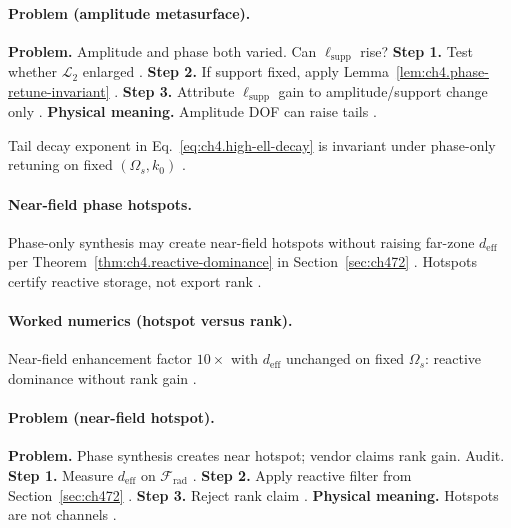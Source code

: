 \paragraph{Problem (amplitude metasurface).}
\textbf{Problem.} Amplitude and phase both varied. Can \(\ell_{\mathrm{supp}}\) rise?
\textbf{Step 1.} Test whether \(\mathcal{L}_{2}\) enlarged \cite{stratton1941,harrington2001}.
\textbf{Step 2.} If support fixed, apply Lemma~\ref{lem:ch4.phase-retune-invariant} \cite{hansen1988,devaney2004}.
\textbf{Step 3.} Attribute \(\ell_{\mathrm{supp}}\) gain to amplitude/support change only \cite{jackson1999,collin2001}.
\textbf{Physical meaning.} Amplitude DOF can raise tails \cite{harrington2001,stratton1941}.

\begin{corollary}
\label{cor:ch4.phase-tail-invariant}
Tail decay exponent in Eq.~\eqref{eq:ch4.high-ell-decay} is invariant under phase-only retuning on fixed \((\Omega_{s},k_{0})\)
\cite{hansen1988,jackson1999,stratton1941,harrington2001,devaney2004}.
\end{corollary}

\paragraph{Near-field phase hotspots.}
Phase-only synthesis may create near-field hotspots without raising far-zone \(d_{\mathrm{eff}}\) per Theorem~\ref{thm:ch4.reactive-dominance} in
Section~\ref{sec:ch472} \cite{stratton1941,harrington2001,hansen1988,devaney2004,jackson1999,collin2001}. Hotspots certify reactive storage, not export rank
\cite{harrington2001,stratton1941}.

\paragraph{Worked numerics (hotspot versus rank).}
Near-field enhancement factor \(10\times\) with \(d_{\mathrm{eff}}\) unchanged on fixed \(\Omega_{s}\): reactive dominance without rank gain
\cite{harrington2001,jackson1999,stratton1941,hansen1988,devaney2004,collin2001}.

\paragraph{Problem (near-field hotspot).}
\textbf{Problem.} Phase synthesis creates near hotspot; vendor claims rank gain. Audit.
\textbf{Step 1.} Measure \(d_{\mathrm{eff}}\) on \(\mathcal{F}_{\mathrm{rad}}\) \cite{harrington2001,hansen1988}.
\textbf{Step 2.} Apply reactive filter from Section~\ref{sec:ch472} \cite{stratton1941,devaney2004}.
\textbf{Step 3.} Reject rank claim \cite{jackson1999,collin2001}.
\textbf{Physical meaning.} Hotspots are not channels \cite{harrington2001,stratton1941}.

